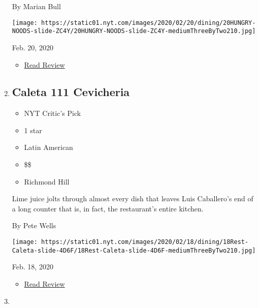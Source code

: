 \begin{enumerate}
  By Marian Bull

  \texttt{[image: https://static01.nyt.com/images/2020/02/20/dining/20HUNGRY-NOODS-slide-ZC4Y/20HUNGRY-NOODS-slide-ZC4Y-mediumThreeByTwo210.jpg]}

  Feb. 20, 2020

  \begin{itemize}
  \tightlist
  \item
    \href{https://www.nytimes.com/2020/02/20/dining/noods-n-chill-review-thai.html?rref=collection\%2Fcollection\%2Frestaurant-guide}{Read
    Review}
  \end{itemize}
\item
  \href{https://www.nytimes.com/2020/02/18/dining/caleta-111-cevicheria-review-pete-wells.html}{}

  \hypertarget{caleta-111-cevicheria}{%
  \subsection{Caleta 111 Cevicheria}\label{caleta-111-cevicheria}}

  \begin{itemize}
  \tightlist
  \item
    NYT Critic's Pick
  \item
     1 star
  \item
    Latin American
  \item
    \$\$
  \item
    Richmond Hill
  \end{itemize}

  Lime juice jolts through almost every dish that leaves Luis
  Caballero's end of a long counter that is, in fact, the restaurant's
  entire kitchen.

  By Pete Wells

  \texttt{[image: https://static01.nyt.com/images/2020/02/18/dining/18Rest-Caleta-slide-4D6F/18Rest-Caleta-slide-4D6F-mediumThreeByTwo210.jpg]}

  Feb. 18, 2020

  \begin{itemize}
  \tightlist
  \item
    \href{https://www.nytimes.com/2020/02/18/dining/caleta-111-cevicheria-review-pete-wells.html?rref=collection\%2Fcollection\%2Frestaurant-guide}{Read
    Review}
  \end{itemize}
\item
  \href{https://www.nytimes.com/2020/02/13/dining/joju-review-banh-mi.html}{}


\end{enumerate}
